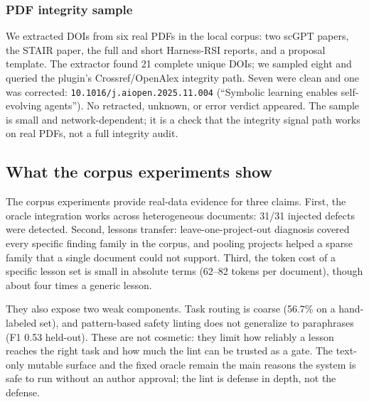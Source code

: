 \subsubsection{PDF integrity sample}
\label{sec:pdf-exp}
We extracted DOIs from six real PDFs in the local corpus: two scGPT papers, the STAIR paper, the full and short Harness-RSI reports, and a proposal template. The extractor found 21 complete unique DOIs; we sampled eight and queried the plugin's Crossref/OpenAlex integrity path. Seven were clean and one was corrected: \texttt{10.1016/j.aiopen.2025.11.004} (``Symbolic learning enables self-evolving agents''). No retracted, unknown, or error verdict appeared. The sample is small and network-dependent; it is a check that the integrity signal path works on real PDFs, not a full integrity audit.

\subsection{What the corpus experiments show}
\label{sec:corpus-summary}
The corpus experiments provide real-data evidence for three claims. First, the oracle integration works across heterogeneous documents: 31/31 injected defects were detected. Second, lessons transfer: leave-one-project-out diagnosis covered every specific finding family in the corpus, and pooling projects helped a sparse family that a single document could not support. Third, the token cost of a specific lesson set is small in absolute terms (62--82 tokens per document), though about four times a generic lesson.

They also expose two weak components. Task routing is coarse (56.7\% on a hand-labeled set), and pattern-based safety linting does not generalize to paraphrases (F1 0.53 held-out). These are not cosmetic: they limit how reliably a lesson reaches the right task and how much the lint can be trusted as a gate. The text-only mutable surface and the fixed oracle remain the main reasons the system is safe to run without an author approval; the lint is defense in depth, not the defense.
